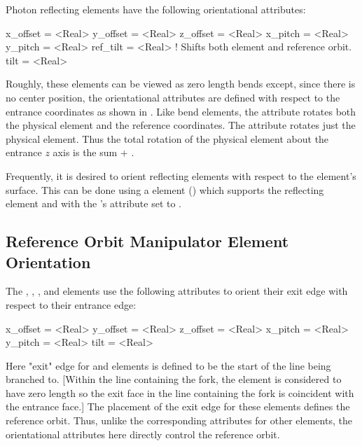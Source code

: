 Photon reflecting elements have the following orientational attributes:
\begin{example}
  x_offset = <Real>
  y_offset = <Real>
  z_offset = <Real>
  x_pitch  = <Real>
  y_pitch  = <Real>
  ref_tilt = <Real>    ! Shifts both element and reference orbit.
  tilt     = <Real>    
\end{example}
Roughly, these elements can be viewed as zero length bends except, since there is no center
position, the orientational attributes are defined with respect to the entrance coordinates as shown
in . Like bend elements, the  attribute rotates both the physical
element and the reference coordinates.  The  attribute rotates just the physical
element. Thus the total rotation of the physical element about the entrance $z$ axis is the sum
 + .

Frequently, it is desired to orient reflecting elements with respect to the element's surface. This
can be done using a  element () which supports the reflecting element and
with the 's  attribute set to .

\subsection{Reference Orbit Manipulator Element Orientation}
\label{s:manip.orient}

The , , , and  elements use the following
attributes to orient their exit edge with respect to their entrance edge:
\begin{example}
  x_offset = <Real>
  y_offset = <Real>
  z_offset = <Real>
  x_pitch  = <Real>
  y_pitch  = <Real>
  tilt     = <Real>    
\end{example}
Here "exit" edge for  and  elements is defined to be the start of the line
being branched to. [Within the line containing the fork, the  element is considered to have
zero length so the exit face in the line containing the fork is coincident with the entrance face.]
The placement of the exit edge for these elements defines the reference orbit.  Thus, unlike the
corresponding attributes for other elements, the orientational attributes here directly control the
reference orbit.

